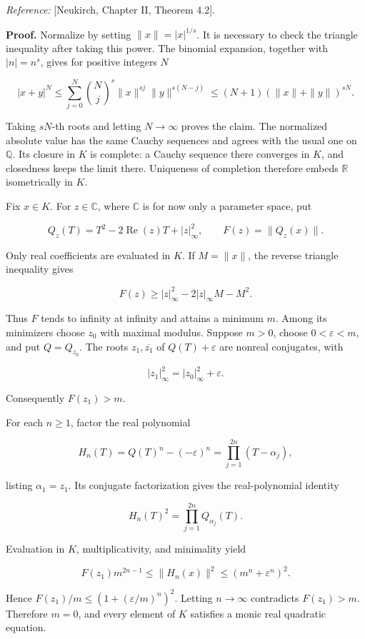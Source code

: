 \documentclass[
  english,
  11pt,
  a4paper,
]{article}
\begin{document}
\emph{Reference:} {[}Neukirch, Chapter II, Theorem 4.2{]}.

\textbf{Proof.} Normalize by setting \(\|x\|=|x|^{1/s}\). It is
necessary to check the triangle inequality after taking this power. The
binomial expansion, together with \(|n|=n^s\), gives for positive
integers \(N\)

\[|x+y|^N
\le\sum_{j=0}^{N}\binom Nj^s\|x\|^{sj}\|y\|^{s(N-j)}
\le(N+1)(\|x\|+\|y\|)^{sN}.\]

Taking \(sN\)-th roots and letting \(N\to\infty\) proves the claim. The
normalized absolute value has the same Cauchy sequences and agrees with
the usual one on \(\mathbb Q\). Its closure in \(K\) is complete: a
Cauchy sequence there converges in \(K\), and closedness keeps the limit
there. Uniqueness of completion therefore embeds \(\mathbb R\)
isometrically in \(K\).

Fix \(x\in K\). For \(z\in\mathbb C\), where \(\mathbb C\) is for now
only a parameter space, put

\[Q_z(T)=T^2-2\operatorname{Re}(z)T+|z|_\infty^2,
\qquad F(z)=\|Q_z(x)\|.\]

Only real coefficients are evaluated in \(K\). If \(M=\|x\|\), the
reverse triangle inequality gives

\[F(z)\ge |z|_\infty^2-2|z|_\infty M-M^2.\]

Thus \(F\) tends to infinity at infinity and attains a minimum \(m\).
Among its minimizers choose \(z_0\) with maximal modulus. Suppose
\(m>0\), choose \(0<\varepsilon<m\), and put \(Q=Q_{z_0}\). The roots
\(z_1,\overline{z_1}\) of \(Q(T)+\varepsilon\) are nonreal conjugates,
with

\[|z_1|_\infty^2=|z_0|_\infty^2+\varepsilon.\]

Consequently \(F(z_1)>m\).

For each \(n\ge1\), factor the real polynomial

\[H_n(T)=Q(T)^n-(-\varepsilon)^n
=\prod_{j=1}^{2n}(T-\alpha_j),\]

listing \(\alpha_1=z_1\). Its conjugate factorization gives the
real-polynomial identity

\[H_n(T)^2=\prod_{j=1}^{2n}Q_{\alpha_j}(T).\]

Evaluation in \(K\), multiplicativity, and minimality yield

\[F(z_1)m^{2n-1}
\le\|H_n(x)\|^2
\le(m^n+\varepsilon^n)^2.\]

Hence \(F(z_1)/m\le(1+(\varepsilon/m)^n)^2\). Letting \(n\to\infty\)
contradicts \(F(z_1)>m\). Therefore \(m=0\), and every element of \(K\)
satisfies a monic real quadratic equation.
\end{document}
